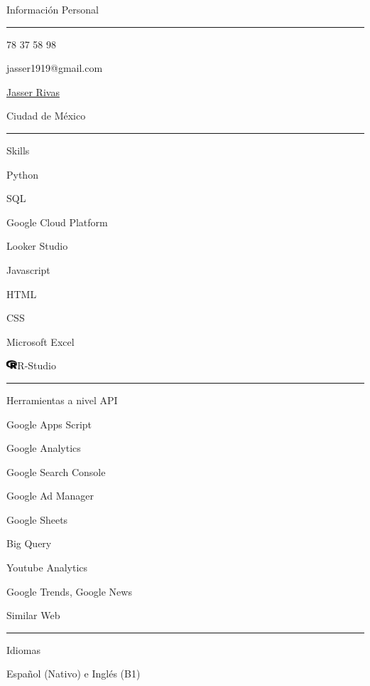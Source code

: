 \documentclass{article}
\begin{document}
\begin{minipage}[t]{0.40\textwidth}
\setlength{\baselineskip}{1.5\baselineskip}
\color{white}
\vspace{.5cm}
{\large Información Personal}

\rule{\linewidth}{0.4pt}

\faPhone\quad  \faWhatsapp{} 78 37 58 98 



\faEnvelope\quad jasser1919@gmail.com



\href{https://www.linkedin.com/in/jasser-abad-rivas-hernandez-289421209/}{\faLinkedin\quad Jasser Rivas}

\faMapMarker\quad Ciudad de México


%



\rule{\linewidth}{0.4pt}

{\large Skills}

\faPython\quad Python



\faDatabase\quad SQL



\faCloud\quad Google Cloud Platform

\faChartLine\quad Looker Studio


\faJs\quad Javascript

 \quad HTML

\quad CSS


\faWindows\quad Microsoft Excel



\includegraphics[width=0.16in, decodearray={1 0 1 0 1 0}]{r-project.png}\quad R-Studio




\rule{\linewidth}{0.4pt}

{\large Herramientas a nivel API}

\faGoogle\quad Google Apps Script

\faChartLine\quad Google Analytics

\faSearchengin\quad Google Search Console

\faFilter\quad Google Ad Manager

\faTable\quad Google Sheets

\faDatabase\quad Big Query

\faYoutube\quad Youtube Analytics

\faNewspaper\quad Google Trends, Google News

\faGlobe\quad Similar Web






\rule{\linewidth}{0.4pt}

{\large Idiomas}

\faLanguage \quad Español (Nativo) e Inglés (B1)

\end{minipage}
\end{document}
